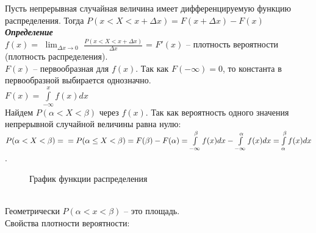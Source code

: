 \documentclass[russian, 12pt, fleqn,x11names]{article}
\begin{document}
Пусть непрерывная случайная величина имеет дифференцируемую функцию распределения. Тогда $P(x<X<x + \Delta x) =  F(x + \Delta x) - F(x)$\\
\textit{\textbf{Определение}}\\ $f(x) =$ $\displaystyle { \lim_{{\Delta x} \to {0}}}$ $\frac{P(x<X<x+\Delta x)}{\Delta x}$ = $F'(x)$ -- плотность вероятности (плотность распределения).\\
$F(x)$ -- первообразная для $f(x)$. Так как $F(-\infty)=0$, то константа в первообразной выбирается однозначно.\\
$F(x) = \int\limits_{-\infty}^{x}f(x)dx$\\
Найдем $P(\alpha < X < \beta)$ через $f(x)$. Так как вероятность одного значения непрерывной случайной величины равна нулю: $P(\alpha <  X < \beta) = \\=P(\alpha \leq  X < \beta) = F(\beta) - F(\alpha)=  \int\limits_{-\infty}^{\beta}f(x)dx -   \int\limits_{-\infty}^{\alpha}f(x)dx =  \int\limits_{\alpha}^{\beta}f(x)dx$.
\begin{figure}[!h]
\caption{График функции распределения}
\end{figure}\\
Геометрически $P(\alpha<x<\beta)$ -- это площадь.\\
Свойства плотности вероятности:\\
\end{document}
